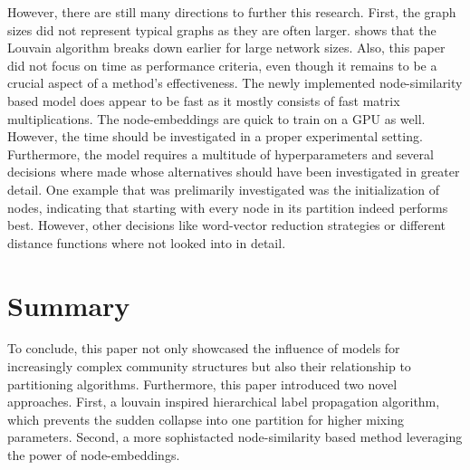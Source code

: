 \documentclass[11pt, twocolumn]{article}
\begin{document}
However, there are still many directions to further this research. First, the graph sizes did not represent typical graphs as they are often larger. \citeauthor{lancichinetti_CommunityDetectionAlgorithms_2009} shows that the Louvain algorithm breaks down earlier for large network sizes. Also, this paper did not focus on time as performance criteria, even though it remains to be a crucial aspect of a method's effectiveness. The newly implemented node-similarity based model does appear to be fast as it mostly consists of fast matrix multiplications. The node-embeddings are quick to train on a GPU as well. However, the time should be investigated in a proper experimental setting. Furthermore, the model requires a multitude of hyperparameters and several decisions where made whose alternatives should have been investigated in greater detail. One example that was prelimarily investigated was the initialization of nodes, indicating that starting with every node in its partition indeed performs best. However, other decisions like word-vector reduction strategies or different distance functions where not looked into in detail.

\section{Summary}
\label{sec:summary}
To conclude, this paper not only showcased the influence of models for increasingly complex community structures but also their relationship to partitioning algorithms. Furthermore, this paper introduced two novel approaches. First, a louvain inspired hierarchical label propagation algorithm, which prevents the sudden collapse into one partition for higher mixing parameters. Second, a more sophistacted node-similarity based method leveraging the power of node-embeddings.

\newpage
\appendix
\end{document}
